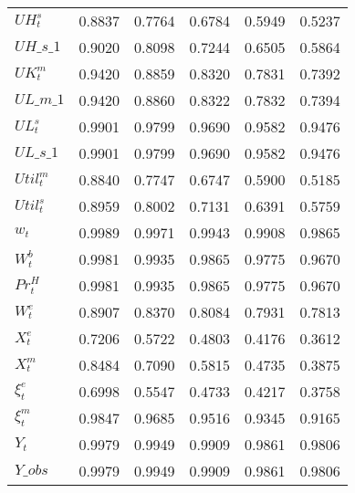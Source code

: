 \begin{center}
\begin{longtable}{lccccc}
$  UH^s_t                   $	 & 	    0.8837	 & 	    0.7764	 & 	    0.6784	 & 	    0.5949	 & 	    0.5237 \\ 
$UH\_s\_1                   $	 & 	    0.9020	 & 	    0.8098	 & 	    0.7244	 & 	    0.6505	 & 	    0.5864 \\ 
$  UK^m_t                   $	 & 	    0.9420	 & 	    0.8859	 & 	    0.8320	 & 	    0.7831	 & 	    0.7392 \\ 
$UL\_m\_1                   $	 & 	    0.9420	 & 	    0.8860	 & 	    0.8322	 & 	    0.7832	 & 	    0.7394 \\ 
$  UL^s_t                   $	 & 	    0.9901	 & 	    0.9799	 & 	    0.9690	 & 	    0.9582	 & 	    0.9476 \\ 
$UL\_s\_1                   $	 & 	    0.9901	 & 	    0.9799	 & 	    0.9690	 & 	    0.9582	 & 	    0.9476 \\ 
$ Util^m_t                  $	 & 	    0.8840	 & 	    0.7747	 & 	    0.6747	 & 	    0.5900	 & 	    0.5185 \\ 
$  Util^s_t                 $	 & 	    0.8959	 & 	    0.8002	 & 	    0.7131	 & 	    0.6391	 & 	    0.5759 \\ 
$ w_t                       $	 & 	    0.9989	 & 	    0.9971	 & 	    0.9943	 & 	    0.9908	 & 	    0.9865 \\ 
$ W^b_t                     $	 & 	    0.9981	 & 	    0.9935	 & 	    0.9865	 & 	    0.9775	 & 	    0.9670 \\ 
$ Pr^H_t                    $	 & 	    0.9981	 & 	    0.9935	 & 	    0.9865	 & 	    0.9775	 & 	    0.9670 \\ 
$ W^e_t                     $	 & 	    0.8907	 & 	    0.8370	 & 	    0.8084	 & 	    0.7931	 & 	    0.7813 \\ 
$ X^e_t                     $	 & 	    0.7206	 & 	    0.5722	 & 	    0.4803	 & 	    0.4176	 & 	    0.3612 \\ 
$ X^m_t                     $	 & 	    0.8484	 & 	    0.7090	 & 	    0.5815	 & 	    0.4735	 & 	    0.3875 \\ 
$ \xi^e_t                   $	 & 	    0.6998	 & 	    0.5547	 & 	    0.4733	 & 	    0.4217	 & 	    0.3758 \\ 
$  \xi^m_t                  $	 & 	    0.9847	 & 	    0.9685	 & 	    0.9516	 & 	    0.9345	 & 	    0.9165 \\ 
$ Y_t                       $	 & 	    0.9979	 & 	    0.9949	 & 	    0.9909	 & 	    0.9861	 & 	    0.9806 \\ 
$Y\_obs                     $	 & 	    0.9979	 & 	    0.9949	 & 	    0.9909	 & 	    0.9861	 & 	    0.9806 \\ 

\end{longtable}
\end{center}
